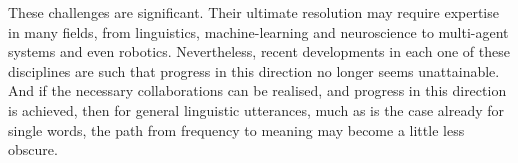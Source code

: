 These challenges are significant. Their ultimate resolution may require expertise in many fields, from linguistics, machine-learning and neuroscience to multi-agent systems and even robotics. Nevertheless, recent developments in each one of these disciplines are such that progress in this direction no longer seems unattainable. And if the necessary collaborations can be realised, and progress in this direction is achieved, then for general linguistic utterances, much as is the case already for single words, the path from frequency to meaning may become a little less obscure. 
